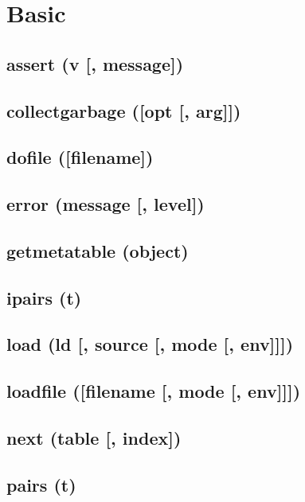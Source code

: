 \documentclass[12pt]{article}
\begin{document}
\newpage

\section{Basic}

\subsection{assert (v [, message])}

\subsection{collectgarbage ([opt [, arg]])}

\subsection{dofile ([filename])}

\subsection{error (message [, level])}

\subsection{getmetatable (object)}

\subsection{ipairs (t)}

\subsection{load (ld [, source [, mode [, env]]])}

\subsection{loadfile ([filename [, mode [, env]]])}

\subsection{next (table [, index])}

\subsection{pairs (t)}
\end{document}
